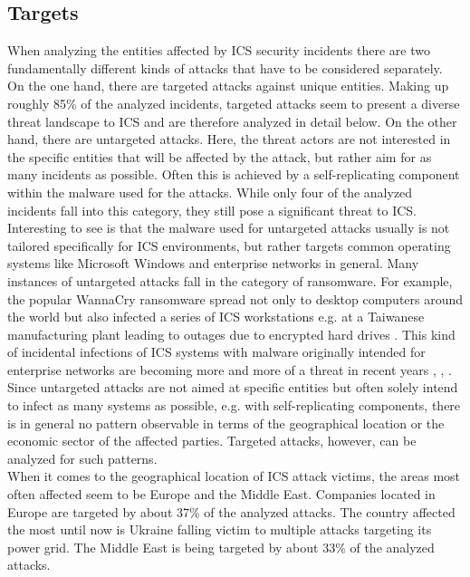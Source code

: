 \documentclass[runningheads]{llncs}
\begin{document}
\subsection{Targets}
\label{subsection:overview-targets}
When analyzing the entities affected by ICS security incidents there are two fundamentally different kinds of attacks that have to be considered separately.
On the one hand, there are targeted attacks against unique entities.
Making up roughly 85\% of the analyzed incidents, targeted attacks seem to present a diverse threat landscape to ICS and are therefore analyzed in detail below.
On the other hand, there are untargeted attacks.
Here, the threat actors are not interested in the specific entities that will be affected by the attack, but rather aim for as many incidents as possible.
Often this is achieved by a self-replicating component within the malware used for the attacks.
While only four of the analyzed incidents fall into this category, they still pose a significant threat to ICS.
Interesting to see is that the malware used for untargeted attacks usually is not tailored specifically for ICS environments, but rather targets common operating systems like Microsoft Windows and enterprise networks in general.
Many instances of untargeted attacks fall in the category of ransomware.
For example, the popular WannaCry ransomware spread not only to desktop computers around the world but also infected a series of ICS workstations e.g. at a Taiwanese manufacturing plant leading to outages due to encrypted hard drives \cite{skybox.18}.
This kind of incidental infections of ICS systems with malware originally intended for enterprise networks are becoming more and more of a threat in recent years \cite{dragos.19}, \cite{cyberx.19}, \cite{zimba.18}.\\
Since untargeted attacks are not aimed at specific entities but often solely intend to infect as many systems as possible, e.g. with self-replicating components, there is in general no pattern observable in terms of the geographical location or the economic sector of the affected parties.
Targeted attacks, however, can be analyzed for such patterns.\\
When it comes to the geographical location of ICS attack victims, the areas most often affected seem to be Europe and the Middle East.
Companies located in Europe are targeted by about 37\% of the analyzed attacks. The country affected the most until now is Ukraine falling victim to multiple attacks targeting its power grid.
The Middle East is being targeted by about 33\% of the analyzed attacks.
\end{document}

